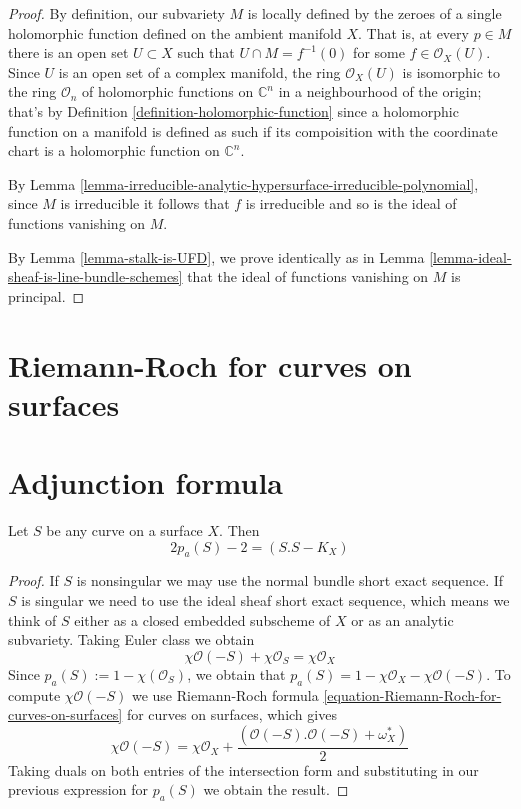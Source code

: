\begin{proof}
By definition, our subvariety $M$ is locally defined by the zeroes of a single 
holomorphic function defined on the ambient manifold $X$. That is,
at every $p\in M$ there is an open set $U\subset X$ such that $U\cap
M=f^{-1}(0)$ for some $f\in\mathcal{O}_X(U)$. Since $U$ is an open set of a
complex manifold, the ring $\mathcal{O}_X(U)$ is isomorphic to the ring
$\mathcal{O}_n$ of holomorphic functions on $\mathbb{C}^n$ in a neighbourhood of
the origin; that's by Definition \ref{definition-holomorphic-function} since a
holomorphic function on a manifold is defined as such if its compoisition with
the coordinate chart is a holomorphic function on $\mathbb{C}^n$.

By Lemma
\ref{lemma-irreducible-analytic-hypersurface-irreducible-polynomial}, since $M$
is irreducible it follows that $f$ is irreducible and so is the ideal of
functions vanishing on $M$.

By Lemma \ref{lemma-stalk-is-UFD}, we prove identically as in Lemma 
\ref{lemma-ideal-sheaf-is-line-bundle-schemes} that the ideal of functions
vanishing on $M$ is principal.
\end{proof}

\section{Riemann-Roch for curves on surfaces}
\label{section-Riemann-Roch-for-curves-on-surfaces}





\section{Adjunction formula}
\label{section-adjunction-formula}

\begin{lemma}
\label{lemma-adjunction-formula-for-curves-on-surfaces}
Let $S$ be any curve on a surface $X$. Then
\begin{equation}
\label{equation-adjunction-formula-for-curves-on-surfaces}
2p_a(S)-2=(S.S-K_X)
\end{equation}
\end{lemma}

\begin{proof}
If $S$ is nonsingular we may use the normal bundle short exact sequence. If
$S$ is singular we need to use the ideal sheaf short exact sequence, which means
we think of $S$ either as a closed embedded subscheme of $X$ or as an analytic 
subvariety. Taking Euler class we obtain
$$
\chi\mathcal{O}(-S)+\chi\mathcal{O}_S=\chi\mathcal{O}_X
$$
Since $p_a(S):=1-\chi(\mathcal{O}_S)$, we obtain that
$p_a(S)=1-\chi\mathcal{O}_X-\chi\mathcal{O}(-S)$. To compute
$\chi\mathcal{O}(-S)$ we use Riemann-Roch formula
\ref{equation-Riemann-Roch-for-curves-on-surfaces} for curves on surfaces, which
gives
$$
\chi\mathcal{O}(-S)=\chi\mathcal{O}_X
+\frac{(\mathcal{O}(-S).\mathcal{O}(-S)+\omega_X^*)}{2}
$$
Taking duals on both entries of the intersection form and substituting in our
previous expression for $p_a(S)$ we obtain the result.
\end{proof}

